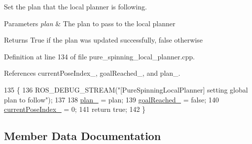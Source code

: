 Set the plan that the local planner is following. 


\begin{DoxyParams}{Parameters}
{\em plan} & The plan to pass to the local planner \\
\hline
\end{DoxyParams}
\begin{DoxyReturn}{Returns}
True if the plan was updated successfully, false otherwise 
\end{DoxyReturn}


Definition at line 134 of file pure\+\_\+spinning\+\_\+local\+\_\+planner.\+cpp.



References current\+Pose\+Index\+\_\+, goal\+Reached\+\_\+, and plan\+\_\+.


\begin{DoxyCode}
135 \{
136   ROS\_DEBUG\_STREAM(\textcolor{stringliteral}{"[PureSpinningLocalPlanner] setting global plan to follow"});
137 
138   \hyperlink{classcl__move__base__z_1_1pure__spinning__local__planner_1_1PureSpinningLocalPlanner_a31875ee78bae4698b579e20c0754860d}{plan\_} = plan;
139   \hyperlink{classcl__move__base__z_1_1pure__spinning__local__planner_1_1PureSpinningLocalPlanner_aecfe0dfc68b8c8e461e8b684e5fa4d2f}{goalReached\_} = \textcolor{keyword}{false};
140   \hyperlink{classcl__move__base__z_1_1pure__spinning__local__planner_1_1PureSpinningLocalPlanner_aa0f9b4cf52a76e44dc2cfc5103d52dcd}{currentPoseIndex\_} = 0;
141   \textcolor{keywordflow}{return} \textcolor{keyword}{true};
142 \}
\end{DoxyCode}


\subsection{Member Data Documentation}
\mbox{\label{classcl__move__base__z_1_1pure__spinning__local__planner_1_1PureSpinningLocalPlanner_a63f75481071df118d56e8b652e68b002}} 
